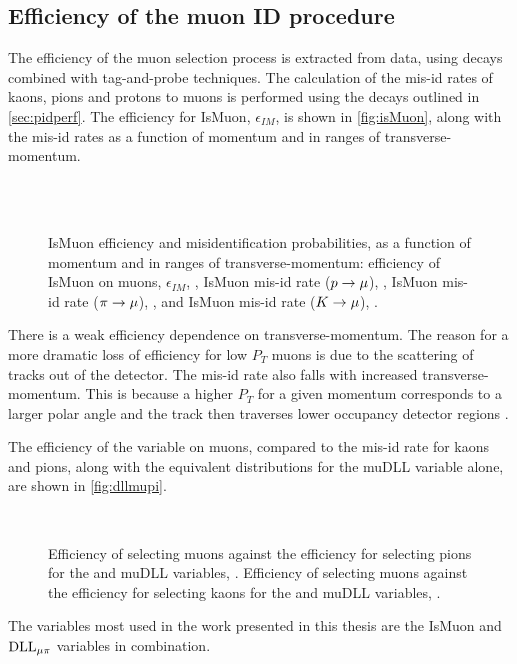 \subsection{Efficiency of the muon ID procedure}
The efficiency of the muon selection process is extracted from data, using \jpsi\to\mup\mun decays combined with tag-and-probe techniques. The calculation of the mis-id rates of kaons, pions and protons to muons is performed using the decays outlined in \autoref{sec:pidperf}. The efficiency for IsMuon, $\epsilon_{IM}$, is shown in \autoref{fig:isMuon}, along with the mis-id rates as a function of momentum and in ranges of transverse-momentum.


\begin{figure}
  \centering
  \\
  \\      
  \caption{
 IsMuon efficiency and misidentification probabilities, as a function of momentum and in ranges of transverse-momentum: efficiency of IsMuon on muons, $\epsilon_{IM}$, \protect{}, IsMuon mis-id rate (${p}\rightarrow\mu$), \protect{}, IsMuon mis-id rate (${\pi}\rightarrow\mu$), \protect{}, and IsMuon mis-id rate (${K}\rightarrow\mu$), \protect{} \cite{muonID}.
  }
  \label{fig:isMuon}
\end{figure}

There is a weak efficiency dependence on transverse-momentum. The reason for a more dramatic loss of efficiency for low $P_{T}$ muons is due to the scattering of tracks out of the detector. The mis-id rate also falls with increased transverse-momentum. This is because a higher $P_{T}$ for a given momentum corresponds to a larger polar angle and the track then traverses lower occupancy detector regions \cite{muonID}.

The efficiency of the \dllmupi variable on muons, compared to the mis-id rate for kaons and pions, along with the equivalent distributions for the muDLL variable alone, are shown in \autoref{fig:dllmupi}.
\begin{figure}[!h]
  \centering
                 \\
        \caption{Efficiency of selecting muons against the efficiency for selecting pions for the \dllmupi and muDLL variables, \protect{}. Efficiency of selecting muons against the efficiency for selecting kaons for the \dllmupi and muDLL variables, \protect{}.
  }
  \label{fig:dllmupi}
\end{figure}
The variables most used in the work presented in this thesis are the IsMuon and $\mathrm{DLL}_{{\mu}\pi}$ variables in combination. 

